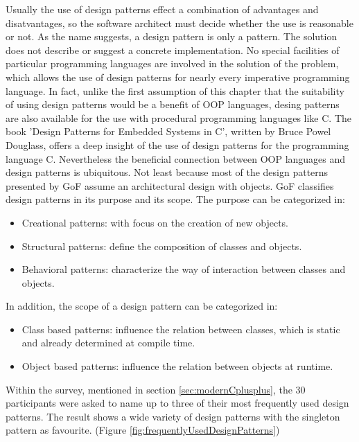 {\noindent Usually the use of design patterns effect a combination of advantages and disatvantages, so the software architect must decide whether the use is reasonable or not. As the name suggests, a design pattern is only a pattern. The solution does not describe or suggest a concrete implementation. No special facilities of particular programming languages are involved in the solution of the problem, which allows the use of design patterns for nearly every imperative programming language. In fact, unlike the first assumption of this chapter that the suitability of using design patterns would be a benefit of OOP languages, desing patterns are also available for the use with procedural programming languages like C. The book 'Design Patterns for Embedded Systems in C', written by Bruce Powel Douglass, offers a deep insight of the use of design patterns for the programming language C. Nevertheless the beneficial connection between OOP languages and design patterns is ubiquitous. Not least because most of the design patterns presented by GoF assume an architectural design with objects. \cite[cf.][29]{GoF2015} GoF classifies design patterns in its purpose and its scope. The purpose can be categorized in:

\begin{itemize}
  \item Creational patterns: with focus on the creation of new objects.
  \item Structural patterns: define the composition of classes and objects.
  \item Behavioral patterns: characterize the way of interaction between classes and objects.
\end{itemize}

\noindent In addition, the scope of a design pattern can be categorized in:

\begin{itemize}
  \item Class based patterns: influence the relation between classes, which is static and already determined at compile time.
  \item Object based patterns: influence the relation between objects at runtime.
\end{itemize}

\noindent Within the survey, mentioned in section \ref{sec:modernCplusplus}, the 30 participants were asked to name up to three of their most frequently used design patterns. The result shows a wide variety of design patterns with the singleton pattern as favourite. (Figure \ref{fig:frequentlyUsedDesignPatterns})

}
